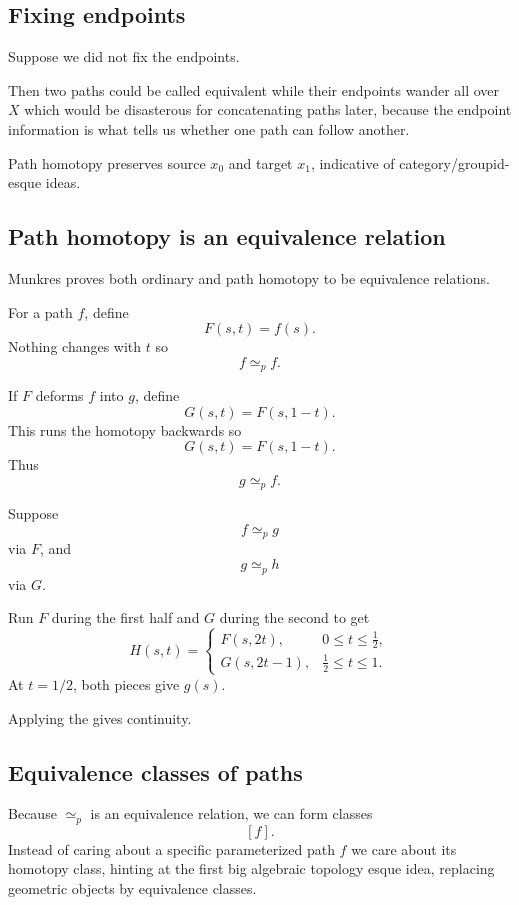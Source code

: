 \documentclass[11pt]{article}
\begin{document}
\subsection{Fixing endpoints}

Suppose we did not fix the endpoints. 

Then two paths could be called equivalent while 
their endpoints wander all over $X$ 
which would be disasterous for concatenating paths 
later, because the endpoint information is what tells 
us whether one path can follow another.

Path homotopy preserves source $x_0$ and 
target $x_1$, indicative of 
category/groupid-esque ideas. 

\subsection{Path homotopy is an equivalence relation} 

Munkres proves both ordinary and path homotopy to 
be equivalence relations.


For a path $f$, define 
\[
    F(s,t) = f(s).
\]
Nothing changes with $t$ so 
\[
    f \simeq_p f. 
\]


If $F$ deforms $f$ into $g$, define 
\[
    G(s,t) = F(s,1-t).
\]
This runs the homotopy backwards so 
\[
    G(s,t) = F(s,1-t). 
\]
Thus 
\[
    g \simeq_p f. 
\]


Suppose 
\[
    f \simeq_p g
\]
via $F$, and 
\[
    g \simeq_p h
\]
via $G$. 

Run $F$ during the first half and $G$ during the 
second to get 
\[
    H(s,t) = 
    \begin{cases}
        F(s,2t), & 0 \leq t \leq \frac{1}{2}, \\  
        G(s,2t-1), & \frac{1}{2} \leq t \leq 1. 
    \end{cases}
\]
At $t = 1/2$, both pieces give $g(s)$. 

Applying the  gives continuity. 

\subsection{Equivalence classes of paths}

Because $\simeq_p$ is an equivalence relation, we can form 
classes 
\[
    [f]. 
\]
Instead of caring about a specific parameterized 
path $f$ we care about its homotopy class, 
hinting at the first big algebraic topology esque 
idea, replacing geometric objects by 
equivalence classes. 
\end{document}
